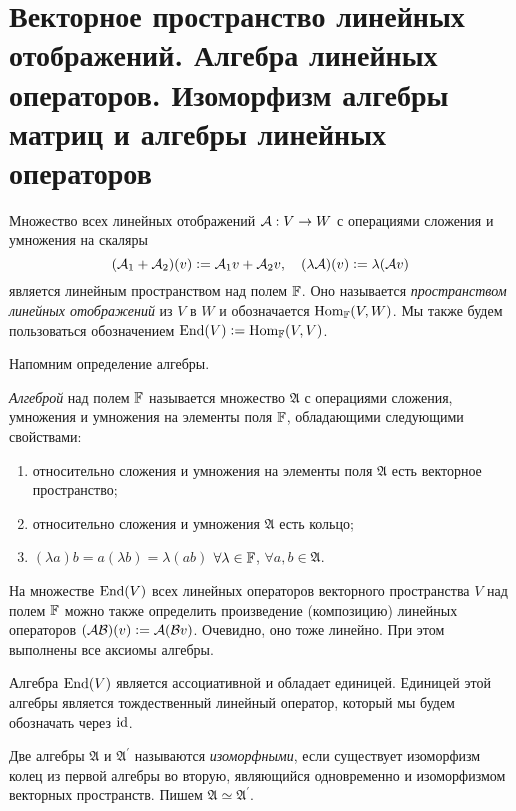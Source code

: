 \section{Векторное пространство линейных отображений. Алгебра линейных операторов. Изоморфизм алгебры матриц и алгебры линейных операторов}

\renewcommand{\C}{\mathcal{C}}

\begin{definition}
    Множество всех линейных отображений $\mathcal{A}: V \to W$ с операциями сложения и умножения на скаляры
    \[
        (\mathcal{A}_1 + \mathcal{A}_2)(v) \vcentcolon = \mathcal{A}_1v + \mathcal{A}_2v,\quad (\lambda\mathcal{A})(v) \vcentcolon = \lambda(\mathcal{A} v)
    \]
    является линейным пространством над полем $\mathbb{F}$. Оно называется \textit{пространством линейных отображений} из $V$ в $W$ и обозначается $\operatorname{Hom}_{\mathbb{F}}(V, W)$. Мы также будем пользоваться обозначением $\operatorname{End}(V) \vcentcolon = \operatorname{Hom}_{\mathbb{F}}(V, V)$.
\end{definition}

Напомним определение алгебры.

\begin{definition}
    \textit{Алгеброй} над полем $\mathbb{F}$ называется множество $\mathfrak{A}$ с операциями сложения, умножения и умножения на элементы поля $\mathbb{F}$, обладающими следующими свойствами:
    \begin{enumerate}[nolistsep]
        \item относительно сложения и умножения на элементы поля $\mathfrak{A}$ есть векторное пространство;
        \item относительно сложения и умножения $\mathfrak{A}$ есть кольцо;
        \item $(\lambda a)b = a(\lambda b) = \lambda(ab)$ $\forall \lambda \in \mathbb{F}$, $\forall a, b \in \mathfrak{A}$.
    \end{enumerate}
\end{definition}

На множестве $\operatorname{End}(V)$ всех линейных операторов векторного пространства $V$ над полем $\mathbb{F}$ можно также определить произведение (композицию) линейных операторов $(\mathcal{A}\mathcal{B})(v) \vcentcolon = \mathcal{A}(\mathcal{B} v)$. Очевидно, оно тоже линейно. При этом выполнены все аксиомы алгебры.

Алгебра $\operatorname{End}(V)$ является ассоциативной и обладает единицей. Единицей этой алгебры является тождественный линейный оператор, который мы будем обозначать через $\mathrm{id}$.

\begin{definition}
    Две алгебры $\mathfrak{A}$ и $\mathfrak{A}^\prime$ называются \textit{изоморфными}, если существует изоморфизм колец из первой алгебры во вторую, являющийся одновременно и изоморфизмом векторных пространств. Пишем $\mathfrak{A} \simeq \mathfrak{A}^\prime$.
\end{definition}

